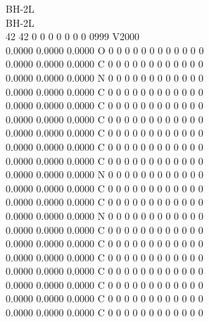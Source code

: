 \documentclass[11pt,titlepage,dvipdfmx,twoside]{jarticle}
\begin{document}
\begin{oframed}
{BH-2L                                                                   \\
BH-2L                                                                   \\
 42 42  0  0  0  0  0  0  0  0999 V2000                                 \\
    0.0000    0.0000    0.0000  O  0  0  0  0  0  0  0  0  0  0  0  0   \\
    0.0000    0.0000    0.0000  C  0  0  0  0  0  0  0  0  0  0  0  0   \\
    0.0000    0.0000    0.0000  N  0  0  0  0  0  0  0  0  0  0  0  0   \\
    0.0000    0.0000    0.0000  C  0  0  0  0  0  0  0  0  0  0  0  0   \\
    0.0000    0.0000    0.0000  C  0  0  0  0  0  0  0  0  0  0  0  0   \\
    0.0000    0.0000    0.0000  C  0  0  0  0  0  0  0  0  0  0  0  0   \\
    0.0000    0.0000    0.0000  C  0  0  0  0  0  0  0  0  0  0  0  0   \\
    0.0000    0.0000    0.0000  C  0  0  0  0  0  0  0  0  0  0  0  0   \\
    0.0000    0.0000    0.0000  C  0  0  0  0  0  0  0  0  0  0  0  0   \\
    0.0000    0.0000    0.0000  N  0  0  0  0  0  0  0  0  0  0  0  0   \\
    0.0000    0.0000    0.0000  C  0  0  0  0  0  0  0  0  0  0  0  0   \\
    0.0000    0.0000    0.0000  C  0  0  0  0  0  0  0  0  0  0  0  0   \\
    0.0000    0.0000    0.0000  N  0  0  0  0  0  0  0  0  0  0  0  0   \\
    0.0000    0.0000    0.0000  C  0  0  0  0  0  0  0  0  0  0  0  0   \\
    0.0000    0.0000    0.0000  C  0  0  0  0  0  0  0  0  0  0  0  0   \\
    0.0000    0.0000    0.0000  C  0  0  0  0  0  0  0  0  0  0  0  0   \\
    0.0000    0.0000    0.0000  C  0  0  0  0  0  0  0  0  0  0  0  0   \\
    0.0000    0.0000    0.0000  C  0  0  0  0  0  0  0  0  0  0  0  0   \\
    0.0000    0.0000    0.0000  C  0  0  0  0  0  0  0  0  0  0  0  0   \\
    0.0000    0.0000    0.0000  C  0  0  0  0  0  0  0  0  0  0  0  0   \\
}
\end{oframed}
\end{document}
